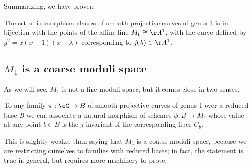  

Summarizing, we have proven:

\begin{theorem}
The set of isomorphism classes of smooth projective curves of genus 1 is in bijection with the points of the affine line $M_1 \cong \AA^1$, with the curve defined by $y^2 = x(x-1)(x-\lambda)$
corresponding to $j(\lambda)\in \AA^1$.
\end{theorem}

\subsection{$M_1$ is a coarse moduli space}

 As we will see,
$M_1$ is not a fine moduli space, but it comes close in two senses. 

\begin{proposition}\label{M1 is coarse}
To any family $\pi : \cC \to B$  of smooth projective curves of genus 1 over a reduced base $B$ we can associate a natural morphism of schemes $\phi : B \to M_1$ whose value at any point $b \in B$ is the $j$-invariant of the corresponding fiber $C_b$.
\end{proposition} 

This is slightly weaker than saying that $M_1$ is a coarse moduli space, because we are restricting ourselves to families with reduced bases; in fact, the statement is true in general, but requires more machinery to prove.

